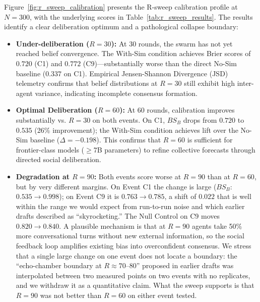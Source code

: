 \documentclass[11pt,journal,onecolumn]{IEEEtran}
\begin{document}
Figure~\ref{fig:r_sweep_calibration} presents the R-sweep calibration profile at $N=300$, with the underlying scores in Table~\ref{tab:r_sweep_results}. The results identify a clear deliberation optimum and a pathological collapse boundary:

\begin{itemize}
    \item \textbf{Under-deliberation ($R=30$):} At 30 rounds, the swarm has not yet reached belief convergence. The With-Sim condition achieves Brier scores of $0.720$ (C1) and $0.772$ (C9)---substantially worse than the direct No-Sim baseline ($0.337$ on C1). Empirical Jensen-Shannon Divergence (JSD) telemetry confirms that belief distributions at $R=30$ still exhibit high inter-agent variance, indicating incomplete consensus formation.
    \item \textbf{Optimal Deliberation ($R=60$):} At 60 rounds, calibration improves substantially vs. $R=30$ on both events. On C1, $BS_B$ drops from $0.720$ to $0.535$ (26\% improvement); the With-Sim condition achieves lift over the No-Sim baseline ($\Delta = -0.198$). This confirms that $R=60$ is sufficient for frontier-class models ($\geq$7B parameters) to refine collective forecasts through directed social deliberation.
    \item \textbf{Degradation at $R=90$:} Both events score worse at $R=90$ than at $R=60$, but by very different margins. On Event C1 the change is large ($BS_B$: $0.535 \to 0.998$); on Event C9 it is $0.763 \to 0.785$, a shift of $0.022$ that is well within the range we would expect from run-to-run noise and which earlier drafts described as ``skyrocketing.'' The Null Control on C9 moves $0.820 \to 0.840$. A plausible mechanism is that at $R=90$ agents take 50\% more conversational turns without new external information, so the social feedback loop amplifies existing bias into overconfident consensus. We stress that a single large change on one event does not locate a boundary: the ``echo-chamber boundary at $R \approx 70$--$80$'' proposed in earlier drafts was interpolated between two measured points on two events with no replicates, and we withdraw it as a quantitative claim. What the sweep supports is that $R=90$ was not better than $R=60$ on either event tested.
\end{itemize}
\end{document}
